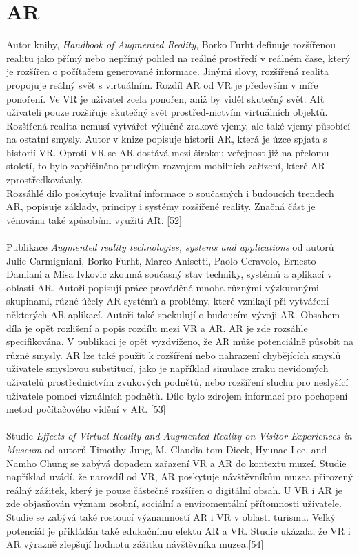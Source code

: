\documentclass[a4paper, 12pt]{report}
\begin{document}
\section{AR}
Autor knihy, \textit{Handbook of Augmented Reality}, Borko Furht definuje rozšířenou realitu jako přímý nebo nepřímý pohled na reálné prostředí v reálném čase, který je rozšířen o počítačem generované informace. Jinými slovy, rozšířená realita propojuje reálný svět s virtuálním. Rozdíl AR od VR je především v míře ponoření. Ve VR je uživatel zcela ponořen, aniž by viděl skutečný svět. AR uživateli pouze rozšiřuje skutečný svět prostřed-nictvím virtuálních objektů. Rozšířená realita nemusí vytvářet výlučně zrakové vjemy, ale také vjemy působící na ostatní smysly. Autor v knize popisuje historii AR, která je úzce spjata s historií VR. Oproti VR se AR dostává mezi širokou veřejnost již na přelomu století, to bylo zapříčiněno prudkým rozvojem mobilních zařízení, které AR zprostředkovávaly.\\
Rozsáhlé dílo poskytuje kvalitní informace o současných i budoucích trendech AR, popisuje základy, principy i systémy rozšířené reality. Značná část je věnována také způsobům využití AR. [52]\\
\\
Publikace \textit{Augmented reality technologies, systems and applications} od autorů Julie Carmigniani, Borko Furht, Marco Anisetti, Paolo Ceravolo, Ernesto Damiani a Misa Ivkovic zkoumá současný stav techniky, systémů a aplikací v oblasti AR. Autoři popisují práce prováděné mnoha různými výzkumnými skupinami, různé účely AR systémů a problémy, které vznikají při vytváření některých AR aplikací. Autoři také spekulují o budoucím vývoji AR. Obsahem díla je opět rozlišení a popis rozdílu mezi VR a AR. AR je zde rozsáhle specifikována. V publikaci je opět vyzdviženo, že AR může potenciálně působit na různé smysly. AR lze také použít k rozšíření nebo nahrazení chybějících smyslů uživatele smyslovou substitucí, jako je například simulace zraku nevidomých uživatelů prostřednictvím zvukových podnětů, nebo rozšíření sluchu pro neslyšící uživatele pomocí vizuálních podnětů. Dílo bylo zdrojem informací pro pochopení metod počítačového vidění v AR. [53]\\
\\
Studie \textit{Effects of Virtual Reality and Augmented
Reality on Visitor Experiences in Museum} od autorů Timothy Jung, M. Claudia tom Dieck, Hyunae Lee, and Namho Chung se zabývá dopadem zařazení VR a AR do kontextu muzeí. Studie například uvádí, že narozdíl od VR, AR poskytuje návštěvníkům muzea přirozený reálný zážitek, který je pouze částečně rozšířen o digitální obsah. U VR i AR je zde objasňován význam osobní, sociální a enviromentální přítomnosti uživatele. Studie se zabývá také rostoucí významností AR i VR v oblasti turismu. Velký potenciál je přikládán také edukačnímu efektu AR a VR. Studie ukázala, že VR i AR výrazně zlepšují hodnotu zážitku návštěvníka muzea.[54]
\end{document}
